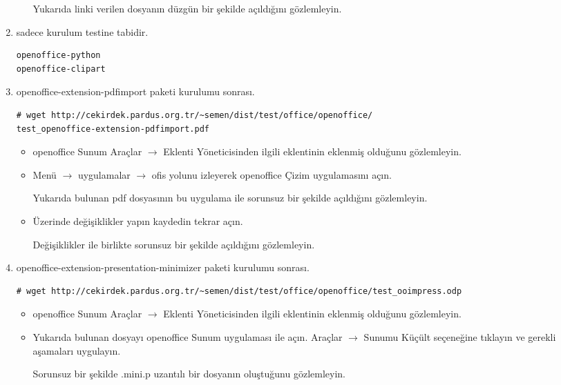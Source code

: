 \documentclass[a4paper,10pt]{article}
\begin{document}
\begin{enumerate}
\begin{itemize}
Yukarıda linki verilen dosyanın düzgün bir şekilde açıldığını gözlemleyin.

\end{itemize}

 \item sadece kurulum testine tabidir.
\begin{verbatim}
openoffice-python
openoffice-clipart
\end{verbatim}

 \item openoffice-extension-pdfimport paketi kurulumu sonrası.
\begin{verbatim}
# wget http://cekirdek.pardus.org.tr/~semen/dist/test/office/openoffice/
test_openoffice-extension-pdfimport.pdf
\end{verbatim}

\begin{itemize}
\item openoffice Sunum Araçlar $\rightarrow$ Eklenti Yöneticisinden ilgili eklentinin eklenmiş olduğunu gözlemleyin.

\item Menü $\rightarrow$ uygulamalar $\rightarrow$ ofis yolunu izleyerek openoffice Çizim uygulamasını açın.

Yukarıda bulunan pdf dosyasının bu uygulama ile sorunsuz bir şekilde açıldığını gözlemleyin.
\item Üzerinde değişiklikler yapın kaydedin tekrar açın.

Değişiklikler ile birlikte sorunsuz bir şekilde açıldığını gözlemleyin.

\end{itemize}
 
\item openoffice-extension-presentation-minimizer paketi kurulumu sonrası.
\begin{verbatim}
# wget http://cekirdek.pardus.org.tr/~semen/dist/test/office/openoffice/test_ooimpress.odp
\end{verbatim}

\begin{itemize}
\item openoffice Sunum Araçlar $\rightarrow$ Eklenti Yöneticisinden ilgili eklentinin eklenmiş olduğunu gözlemleyin.

\item Yukarıda bulunan dosyayı openoffice Sunum uygulaması ile açın. Araçlar  $\rightarrow$  Sunumu Küçült seçeneğine tıklayın ve gerekli aşamaları uygulayın.

Sorunsuz bir şekilde .mini.p uzantılı bir dosyanın oluştuğunu gözlemleyin.


\end{itemize}
\end{enumerate}
\end{document}
